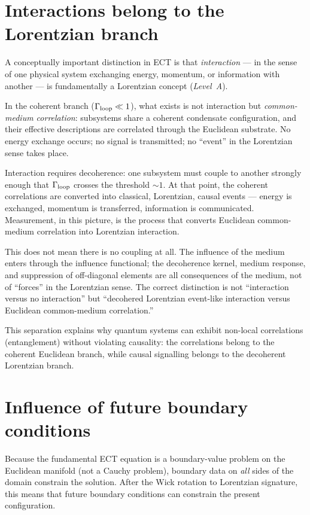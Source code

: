 \documentclass[11pt,a4paper]{article}
\begin{document}
\section{Interactions belong to the Lorentzian branch}

A conceptually important distinction in ECT is that \emph{interaction} --- in the sense of one physical system exchanging energy, momentum, or information with another --- is fundamentally a Lorentzian concept (\emph{Level~A}).

In the coherent branch ($\Gamma_{\rm loop} \ll 1$), what exists is not interaction but \emph{common-medium correlation}: subsystems share a coherent condensate configuration, and their effective descriptions are correlated through the Euclidean substrate. No energy exchange occurs; no signal is transmitted; no ``event'' in the Lorentzian sense takes place.

Interaction requires decoherence: one subsystem must couple to another strongly enough that $\Gamma_{\rm loop}$ crosses the threshold $\sim 1$. At that point, the coherent correlations are converted into classical, Lorentzian, causal events --- energy is exchanged, momentum is transferred, information is communicated. Measurement, in this picture, is the process that converts Euclidean common-medium correlation into Lorentzian interaction.

This does not mean there is no coupling at all. The influence of the medium enters through the influence functional; the decoherence kernel, medium response, and suppression of off-diagonal elements are all consequences of the medium, not of ``forces'' in the Lorentzian sense. The correct distinction is not ``interaction versus no interaction'' but ``decohered Lorentzian event-like interaction versus Euclidean common-medium correlation.''

This separation explains why quantum systems can exhibit non-local correlations (entanglement) without violating causality: the correlations belong to the coherent Euclidean branch, while causal signalling belongs to the decoherent Lorentzian branch.


\section{Influence of future boundary conditions}
\label{sec:pop_future}

Because the fundamental ECT equation is a boundary-value problem on the Euclidean manifold (not a Cauchy problem), boundary data on \emph{all} sides of the domain constrain the solution. After the Wick rotation to Lorentzian signature, this means that future boundary conditions can constrain the present configuration.
\end{document}
